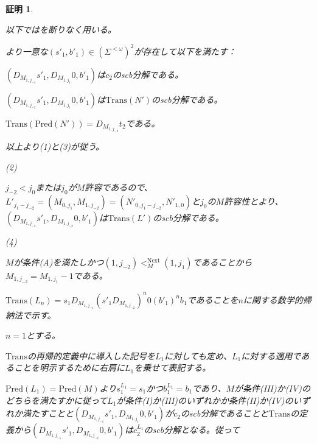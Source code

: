 \documentclass[dvipdfmx,uplatex]{jsarticle}
\theoremstyle{customnonumberbreakfortheorem}
\theoremstyle{customnonumberbreakforproof}
\newtheorem{hideableproof}{証明}
\begin{document}
\begin{hideableproof}
	\begin{indented}
		\item 以下ではを断りなく用いる。
		\item {}より一意な\((s'_1,b'_1) \in (\Sigma^{< \omega})^2\)が存在して以下を満たす：
		\begin{penumerate}
			\item \((D_{M_{1,j_{-1}}} s'_1,D_{M_{1,j_1}} 0,b'_1)\)は\(c_2\)のscb分解である。
			\item \((D_{M_{1,j_{-2}}} s'_1,D_{M_{1,j_1}} 0,b'_1)\)は\(\textrm{Trans}(N')\)のscb分解である。
			\item \(\textrm{Trans}(\textrm{Pred}(N')) = D_{M_{1,j_{-2}}} t_2\)である。
		\end{penumerate}
		\item 以上より(1)と(3)が従う。
		\item
		\item (2)
		\item \(j_{-2} < j_0\)または\(j_0\)が\(M\)許容であるので、\(L'_{j_1-j_{-2}} = (M_{0,j_1},M_{1,j_{-2}}) = (N'_{0,j_1-j_{-2}},N'_{1,0})\)と\(j_0\)の\(M\)許容性とより、\((D_{M_{1,j_{-2}}} s'_1,D_{M_{1,j_{-2}}} 0,b'_1)\)は\(\textrm{Trans}(L')\)のscb分解である。
		\item
		\item (4)
		\item \(M\)が条件(A)を満たしかつ\((1,j_{-2}) <_M^{\textrm{Next}} (1,j_1)\)であることから\(M_{1,j_{-2}} = M_{1,j_1}-1\)である。
		\item \(\textrm{Trans}(L_n) = s_1 D_{M_{1,j_{-1}}} (s'_1 D_{M_{1,j_{-2}}})^n 0 (b'_1)^n b_1\)であることを\(n\)に関する数学的帰納法で示す。
		\item \(n = 1\)とする。
		\begin{indented}
			\item \(\textrm{Trans}\)の再帰的定義中に導入した記号を\(L_1\)に対しても定め、\(L_1\)に対する適用であることを明示するために右肩に\(L_1\)を乗せて表記する。
			\item \(\textrm{Pred}(L_1) = \textrm{Pred}(M)\)より\(s_1^{L_1} = s_1\)かつ\(b_1^{L_1} = b_1\)であり、\(M\)が条件(III)か(IV)のどちらを満たすかに従って\(L_1\)が条件(I)か(III)のいずれかか条件(II)か(IV)のいずれか満たすことと\((D_{M_{1,j_{-1}}} s'_1,D_{M_{1,j_1}} 0,b'_1)\)が\(c_2\)のscb分解であることと\(\textrm{Trans}\)の定義から\((D_{M_{1,j_{-1}}} s'_1,D_{M_{1,j_{-2}}} 0,b'_1)\)は\(c_2^{L_1}\)のscb分解となる。従って

\end{indented}
\end{indented}
\end{hideableproof}
\end{document}
